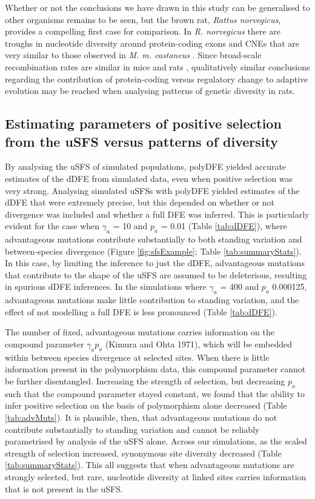 \documentclass[11pt]{article}
\begin{document}
	Whether or not the conclusions we have drawn in this study can be generalised to other organisms remains to be seen, but the brown rat, \textit{Rattus norvegicus}, provides a compelling first case for comparison. In \textit{R. norvegicus} there are troughs in nucleotide diversity around protein-coding exons and CNEs that are very similar to those observed in \textit{M. m. castaneus} \citep{RN327}. Since broad-scale recombination rates are similar in mice and rats \citep{RN184}, qualitatively similar conclusions regarding the contribution of protein-coding versus regulatory change to adaptive evolution may be reached when analysing patterns of genetic diversity in rats. 

\subsection*{Estimating parameters of positive selection from the uSFS versus patterns of diversity}

	By analysing the uSFS of simulated populations, polyDFE yielded accurate estimates of the dDFE from simulated data, even when positive selection was very strong. Analysing simulated uSFSs with polyDFE yielded estimates of the dDFE that were extremely precise, but this depended on whether or not divergence was included and whether a full DFE was inferred. This is particularly evident for the case when $\gamma_a$ = 10 and $p_a$ = 0.01 (Table \ref{tab:dDFE}), where advantageous mutations contribute substantially to both standing variation and between-species divergence (Figure \ref{fig:sfsExample}; Table \ref{tab:summaryStats}). In this case, by limiting the inference to just the dDFE, advantageous mutations that contribute to the shape of the uSFS are assumed to be deleterious, resulting in spurious dDFE inferences. In the simulations where $\gamma_a$ = 400 and $p_a$ 0.000125, advantageous mutations make little contribution to standing variation, and the effect of not modelling a full DFE is less pronounced (Table \ref{tab:dDFE}).

	The number of fixed, advantageous mutations carries information on the compound parameter $\gamma_a p_a$ (Kimura and Ohta 1971), which will be embedded within between species divergence at selected sites. When there is little information present in the polymorphism data, this compound parameter cannot be further disentangled. Increasing the strength of selection, but decreasing $p_a$ such that the compound parameter stayed constant, we found that the ability to infer positive selection on the basis of polymorphism alone decreased (Table \ref{tab:advMuts}). It is plausible, then, that advantageous mutations do not contribute substantially to standing variation and cannot be reliably parametrised by analysis of the uSFS alone. Across our simulations, as the scaled strength of selection increased, synonymous site diversity decreased (Table \ref{tab:summaryStats}). This all suggests that when advantageous mutations are strongly selected, but rare, nucleotide diversity at linked sites carries information that is not present in the uSFS.
	
\end{document}
